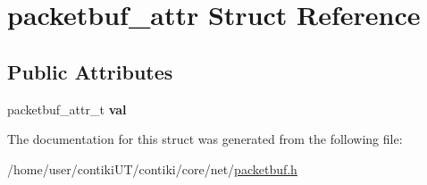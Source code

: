\hypertarget{structpacketbuf__attr}{}\section{packetbuf\+\_\+attr Struct Reference}
\label{structpacketbuf__attr}
\subsection*{Public Attributes}
\begin{DoxyCompactItemize}
\item 
\hypertarget{structpacketbuf__attr_a2df1f2fed326604721a8e94dba27c3db}{}packetbuf\+\_\+attr\+\_\+t {\bfseries val}\label{structpacketbuf__attr_a2df1f2fed326604721a8e94dba27c3db}

\end{DoxyCompactItemize}


The documentation for this struct was generated from the following file\+:\begin{DoxyCompactItemize}
\item 
/home/user/contiki\+U\+T/contiki/core/net/\hyperlink{packetbuf_8h}{packetbuf.\+h}\end{DoxyCompactItemize}
